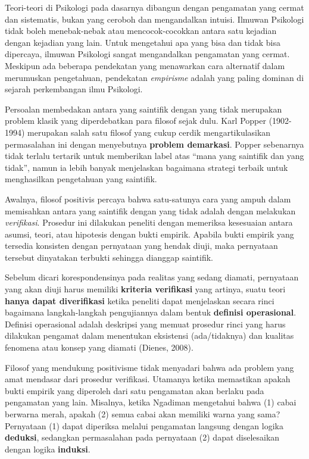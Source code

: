 \documentclass[
  english,
  man]{apa6}
\begin{document}
Teori-teori di Psikologi pada dasarnya dibangun dengan pengamatan yang cermat dan sistematis, bukan yang ceroboh dan mengandalkan intuisi. Ilmuwan Psikologi tidak boleh menebak-nebak atau mencocok-cocokkan antara satu kejadian dengan kejadian yang lain. Untuk mengetahui apa yang bisa dan tidak bisa dipercaya, ilmuwan Psikologi sangat mengandalkan pengamatan yang cermat. Meskipun ada beberapa pendekatan yang menawarkan cara alternatif dalam merumuskan pengetahuan, pendekatan \emph{empirisme} adalah yang paling dominan di sejarah perkembangan ilmu Psikologi.

Persoalan membedakan antara yang saintifik dengan yang tidak merupakan problem klasik yang diperdebatkan para filosof sejak dulu. Karl Popper (1902-1994) merupakan salah satu filosof yang cukup cerdik mengartikulasikan permasalahan ini dengan menyebutnya \textbf{problem demarkasi}. Popper sebenarnya tidak terlalu tertarik untuk memberikan label atas \enquote{mana yang saintifik dan yang tidak}, namun ia lebih banyak menjelaskan bagaimana strategi terbaik untuk menghasilkan pengetahuan yang saintifik.

Awalnya, filosof positivis percaya bahwa satu-satunya cara yang ampuh dalam memisahkan antara yang saintifik dengan yang tidak adalah dengan melakukan \emph{verifikasi}. Prosedur ini dilakukan peneliti dengan memeriksa kesesuaian antara asumsi, teori, atau hipotesis dengan bukti empirik. Apabila bukti empirik yang tersedia konsisten dengan pernyataan yang hendak diuji, maka pernyataan tersebut dinyatakan terbukti sehingga dianggap saintifik.

Sebelum dicari korespondensinya pada realitas yang sedang diamati, pernyataan yang akan diuji harus memiliki \textbf{kriteria verifikasi} yang artinya, suatu teori \textbf{hanya dapat diverifikasi} ketika peneliti dapat menjelaskan secara rinci bagaimana langkah-langkah pengujiannya dalam bentuk \textbf{definisi operasional}. Definisi operasional adalah deskripsi yang memuat prosedur rinci yang harus dilakukan pengamat dalam menentukan eksistensi (ada/tidaknya) dan kualitas fenomena atau konsep yang diamati (Dienes, 2008).

Filosof yang mendukung positivisme tidak menyadari bahwa ada problem yang amat mendasar dari prosedur verifikasi. Utamanya ketika memastikan apakah bukti empirik yang diperoleh dari satu pengamatan akan berlaku pada pengamatan yang lain. Misalnya, ketika Ngadiman mengetahui bahwa (1) cabai berwarna merah, apakah (2) semua cabai akan memiliki warna yang sama? Pernyataan (1) dapat diperiksa melalui pengamatan langsung dengan logika \textbf{deduksi}, sedangkan permasalahan pada pernyataan (2) dapat diselesaikan dengan logika \textbf{induksi}.
\end{document}
